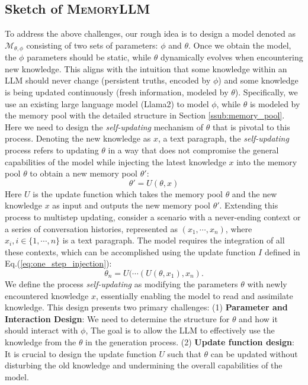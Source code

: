 \documentclass{article}
\theoremstyle{plain}
\theoremstyle{definition}
\theoremstyle{remark}
\newcommand{\ours}{\textsc{MemoryLLM}\xspace}
\begin{document}
\subsection{Sketch of \ours}
To address the above challenges, our rough idea is to design a model denoted as $\mathcal{M}_{\theta, \phi}$ consisting of two sets of parameters: $\phi$ and $\theta$. Once we obtain the model, the $\phi$ parameters should be static, while $\theta$ dynamically evolves when encountering new knowledge. This aligns with the intuition that some knowledge within an LLM should never change (persistent truths, encoded by $\phi$) and some knowledge is being updated continuously (fresh information, modeled by $\theta$). 
Specifically, we use an existing large language model (Llama2) to model $\phi$, while $\theta$ is modeled by the memory pool with the detailed structure in Section \ref{ssub:memory_pool}. 
Here we need to design the \textit{self-updating} mechanism of $\theta$ that is pivotal to this process. 
Denoting the new knowledge as $x$, a text paragraph, the \textit{self-updating} process 
refers to 
updating $\theta$ in a way that does not compromise the general capabilities of the model while injecting the latest knowledge $x$ into the memory pool $\theta$ to obtain a new memory pool $\theta'$:
\begin{equation}\label{eq:one_step_injection}
    \theta' = U(\theta, x)
\end{equation}
Here $U$ is the update function which takes the memory pool $\theta$ and the new knowledge $x$ as input and outputs the new memory pool $\theta'$. 
Extending this process to multistep updating, consider a scenario with a never-ending context or a series of conversation histories, represented as $(x_1, \cdots, x_n)$, where $x_i, i\in\{1,\cdots,n\}$ is a text paragraph. The model requires the integration of all these contexts, which can be accomplished using the update function $I$ defined in Eq.(\ref{eq:one_step_injection}): 
\begin{equation}\label{eq:multi_step_injection}
    \theta_n = U(\cdots(U(\theta, x_1), x_n).
\end{equation}
We define the process \textit{self-updating} as modifying the parameters $\theta$ with newly encountered knowledge $x$, essentially enabling the model to read and assimilate knowledge. This design presents two primary challenges: (1) \textbf{Parameter and Interaction Design}: We need to determine the structure for $\theta$ and how it should interact with $\phi$, The goal is to allow the LLM to effectively use the knowledge from the $\theta$ in the generation process. (2) \textbf{Update function design}: It is crucial to design the update function $U$ such that $\theta$ can be updated without disturbing the old knowledge and undermining the overall capabilities of the model. 
\end{document}
